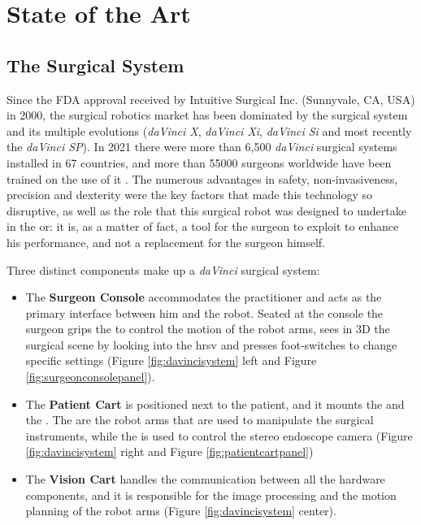 \documentclass[../main.tex]{subfiles}
\begin{document}
\chapter{State of the Art}

\section{The \davinci Surgical System}
Since the FDA approval received by Intuitive Surgical Inc. (Sunnyvale, CA, USA) in 2000, the surgical robotics market has been dominated by the \davinci surgical system and its multiple evolutions (\textit{daVinci X}, \textit{daVinci Xi}, \textit{daVinci Si} and most recently the \textit{daVinci SP}). In 2021 there were more than 6,500 \textit{daVinci} surgical systems installed in 67 countries, and more than 55000 surgeons worldwide have been trained on the use of it \cite{Intuitive2021}. The numerous advantages in safety, non-invasiveness, precision and dexterity were the key factors that made this technology so disruptive, as well as the role that this surgical robot was designed to undertake in the \ac{or}: it is, as a matter of fact, a tool for the surgeon to exploit to enhance his performance, and not a replacement for the surgeon himself.

Three distinct components make up a \textit{daVinci} surgical system:
\begin{itemize}
    \item The \textbf{Surgeon Console} accommodates the practitioner and acts as the primary interface between him and the robot. Seated at the console the surgeon grips the \mtms to control the motion of the robot arms, sees in 3D the surgical scene by looking into the \ac{hrsv} and presses foot-switches to change specific settings (Figure \ref{fig:davincisystem} left and Figure \ref{fig:surgeonconsolepanel}).
    \item The \textbf{Patient Cart} is positioned next to the patient, and it mounts the \psms and the \ecm. The \psms are the robot arms that are used to manipulate the surgical instruments, while the \ecm is used to control the stereo endoscope camera (Figure \ref{fig:davincisystem} right and Figure \ref{fig:patientcartpanel})
    \item The \textbf{Vision Cart} handles the communication between all the hardware components, and it is responsible for the image processing and the motion planning of the robot arms (Figure \ref{fig:davincisystem} center).
\end{itemize}
\end{document}

